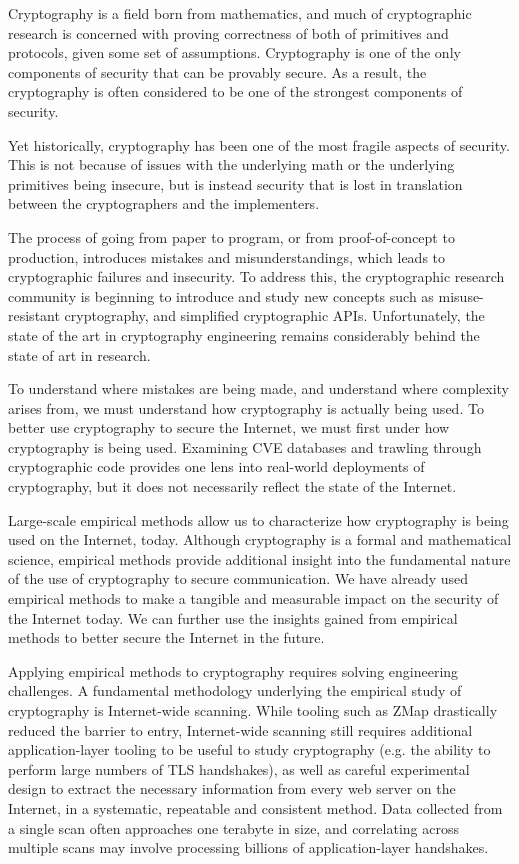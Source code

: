
Cryptography is a field born from mathematics, and much of cryptographic
research is concerned with proving correctness of both of primitives and
protocols, given some set of assumptions. Cryptography is one of the only
components of security that can be provably secure. As a result, the
cryptography is often considered to be one of the strongest components of
security.

Yet historically, cryptography has been one of the most fragile aspects of
security. This is not because of issues with the underlying math or the
underlying primitives being insecure, but is instead security that is lost in
translation between the cryptographers and the implementers.

The process of going from paper to program, or from proof-of-concept to
production, introduces mistakes and misunderstandings, which leads to
cryptographic failures and insecurity. To address this, the cryptographic
research community is beginning to introduce and study new concepts such as
misuse-resistant cryptography, and simplified cryptographic APIs.
Unfortunately, the state of the art in cryptography engineering remains
considerably behind the state of art in research.

To understand where mistakes are being made, and understand where complexity
arises from, we must understand how cryptography is actually being used. To
better use cryptography to secure the Internet, we must first under how
cryptography is being used. Examining CVE databases and trawling through
cryptographic code provides one lens into real-world deployments of
cryptography, but it does not necessarily reflect the state of the Internet.

Large-scale empirical methods allow us to characterize how cryptography is
being used on the Internet, today. Although cryptography is a formal and
mathematical science, empirical methods provide additional insight into the
fundamental nature of the use of cryptography to secure communication. We have
already used empirical methods to make a tangible and measurable impact on the
security of the Internet today. We can further use the insights gained from
empirical methods to better secure the Internet in the future. 

Applying empirical methods to cryptography requires solving engineering
challenges. A fundamental methodology underlying the empirical study of
cryptography is Internet-wide scanning. While tooling such as ZMap drastically
reduced the barrier to entry, Internet-wide scanning still requires additional
application-layer tooling to be useful to study cryptography (e.g. the ability
to perform large numbers of TLS handshakes), as well as careful experimental
design to extract the necessary information from every web server on the
Internet, in a systematic, repeatable and consistent method. Data collected
from a single scan often approaches one terabyte in size, and correlating
across multiple scans may involve processing billions of application-layer
handshakes.

